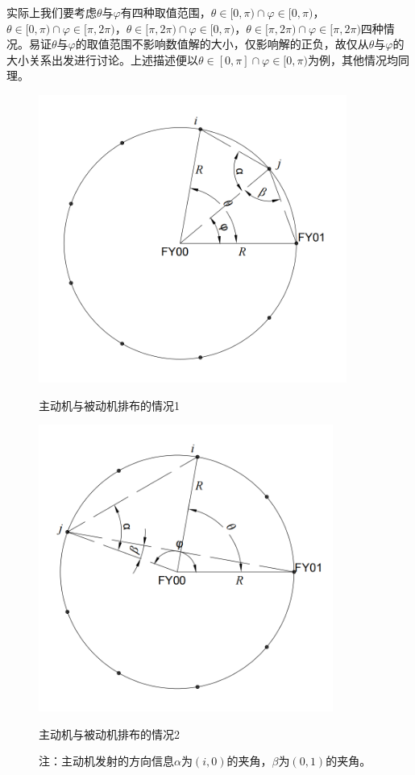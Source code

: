 \documentclass[withoutpreface,bwprint]{cumcmthesis} %
\begin{document}
实际上我们要考虑$\theta$与$\varphi$有四种取值范围，$\theta \in[0,\pi)\cap \varphi \in[0,\pi)$，$\theta \in[0,\pi)\cap \varphi \in[\pi,2\pi)$，$\theta \in[\pi,2\pi)\cap \varphi \in[0,\pi)$，$\theta \in[\pi,2\pi)\cap \varphi \in[\pi,2\pi)$四种情况。易证$\theta$与$\varphi$的取值范围不影响数值解的大小，仅影响解的正负，故仅从$\theta$与$\varphi$的大小关系出发进行讨论。上述描述便以$\theta \in[0,\pi]\cap \varphi \in[0,\pi)$为例，其他情况均同理。


\begin{figure}[htbp]
    \centering
    \begin{minipage}{0.49\textwidth}
        \centering
        \includegraphics[width=0.9\textwidth]{../../figure/q1_1.png} 
        \caption{主动机与被动机排布的情况1}
        \label{q1_1}
    \end{minipage}
    \begin{minipage}{0.49\textwidth}
        \centering
        \includegraphics[width=0.86\textwidth]{../../figure/q1_2.png} 
        \caption{主动机与被动机排布的情况2}
        \label{q1_2}   
    \end{minipage}
    \caption*{\small 注：主动机发射的方向信息$\alpha$为$(i,0)$的夹角，$\beta$为$(0,1)$的夹角。}
\end{figure}
\end{document}
